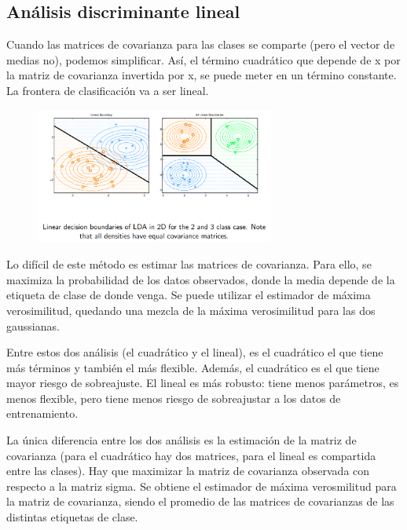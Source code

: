 \subsection{Análisis discriminante lineal}
Cuando las matrices de covarianza para las clases se comparte (pero el vector de medias no), podemos simplificar. Así, el término cuadrático que depende de x por la matriz de covarianza invertida por x, se puede meter en un término constante. La frontera de clasificación va a ser lineal.

\begin{figure}[h]
\centering
\includegraphics[width = 0.7\textwidth]{figs/lda.png}
\end{figure}

Lo difícil de este método es estimar las matrices de covarianza. Para ello, se maximiza la probabilidad de los datos observados, donde la media depende de la etiqueta de clase de donde venga. Se puede utilizar el estimador de máxima verosimilitud, quedando una mezcla de la máxima verosimilitud para las dos gaussianas.

Entre estos dos análisis (el cuadrático y el lineal), es el cuadrático el que tiene más términos y también el más flexible. Además, el cuadrático es el que tiene mayor riesgo de sobreajuste. El lineal es más robusto: tiene menos parámetros, es menos flexible, pero tiene menos riesgo de sobreajustar a los datos de entrenamiento.

La única diferencia entre los dos análisis es la estimación de la matriz de covarianza (para el cuadrático hay dos matrices, para el lineal es compartida entre las clases). Hay que maximizar la matriz de covarianza observada con respecto a la matriz sigma. Se obtiene el estimador de máxima verosmilitud para la matriz de covarianza, siendo el promedio de las matrices de covarianzas de las distintas etiquetas de clase. 

